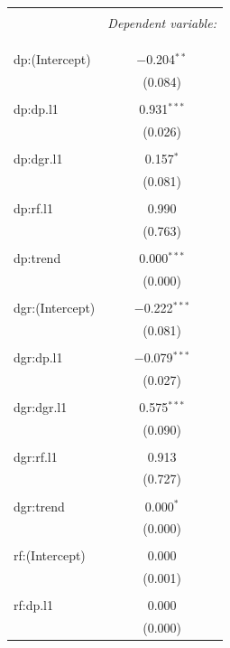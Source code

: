 \documentclass[11pt,letter]{article}
\begin{document}
\begin{table}[!htbp] \centering 
	\caption{} 
	\label{} 
	\begin{tabular}{@{\extracolsep{5pt}}lc} 
		\\[-1.8ex]\hline 
		\hline \\[-1.8ex] 
		& \multicolumn{1}{c}{\textit{Dependent variable:}} \\ 
		\cline{2-2} 
		\\[-1.8ex] &   \\ 
		\hline \\[-1.8ex] 
		dp:(Intercept) & $-$0.204$^{**}$ \\ 
		& (0.084) \\ 
		& \\ 
		dp:dp.l1 & 0.931$^{***}$ \\ 
		& (0.026) \\ 
		& \\ 
		dp:dgr.l1 & 0.157$^{*}$ \\ 
		& (0.081) \\ 
		& \\ 
		dp:rf.l1 & 0.990 \\ 
		& (0.763) \\ 
		& \\ 
		dp:trend & 0.000$^{***}$ \\ 
		& (0.000) \\ 
		& \\ 
		dgr:(Intercept) & $-$0.222$^{***}$ \\ 
		& (0.081) \\ 
		& \\ 
		dgr:dp.l1 & $-$0.079$^{***}$ \\ 
		& (0.027) \\ 
		& \\ 
		dgr:dgr.l1 & 0.575$^{***}$ \\ 
		& (0.090) \\ 
		& \\ 
		dgr:rf.l1 & 0.913 \\ 
		& (0.727) \\ 
		& \\ 
		dgr:trend & 0.000$^{*}$ \\ 
		& (0.000) \\ 
		& \\ 
		rf:(Intercept) & 0.000 \\ 
		& (0.001) \\ 
		& \\ 
		rf:dp.l1 & 0.000 \\ 
		& (0.000) \\ 

\end{tabular}
\end{table}
\end{document}
